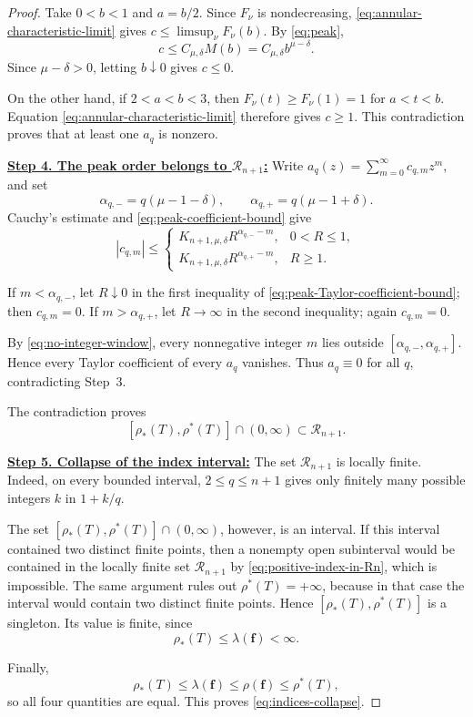 \documentclass[12pt,letterpaper,reqno]{amsart}
\theoremstyle{definition}
\numberwithin{equation}{section}
\newcommand{\Gn}{\mathcal R_{n+1}}
\newcommand{\fv}{\bm f}
\begin{document}
\begin{proof}
Take \(0<b<1\) and \(a=b/2\). Since \(F_\nu\) is nondecreasing,
\eqref{eq:annular-characteristic-limit} gives
\(c\leq\limsup_\nu F_\nu(b)\). By \eqref{eq:peak},
\[
c
\leq
C_{\mu,\delta}M(b)
=
C_{\mu,\delta}b^{\mu-\delta}.
\]
Since \(\mu-\delta>0\), letting \(b\downarrow0\) gives \(c\leq0\).

On the other hand, if \(2<a<b<3\), then
\(F_\nu(t)\geq F_\nu(1)=1\) for \(a<t<b\). Equation
\eqref{eq:annular-characteristic-limit} therefore gives \(c\geq1\).
This contradiction proves that at least one \(a_q\) is nonzero.


\medskip\noindent
\textbf{\underline{Step 4. The peak order belongs to \(\Gn\):}}
Write
\(a_q(z)=\sum_{m=0}^{\infty}c_{q,m}z^m\), and set
\[
\alpha_{q,-}=q(\mu-1-\delta),
\qquad
\alpha_{q,+}=q(\mu-1+\delta).
\]
Cauchy's estimate and \eqref{eq:peak-coefficient-bound} give
\begin{equation}\label{eq:peak-Taylor-coefficient-bound}
 |c_{q,m}|
 \leq
 \begin{cases}
 K_{n+1,\mu,\delta}R^{\alpha_{q,-}-m},
     &0<R\leq1,\\[2mm]
 K_{n+1,\mu,\delta}R^{\alpha_{q,+}-m},
     &R\geq1.
 \end{cases}
\end{equation}

If \(m<\alpha_{q,-}\), let \(R\downarrow0\) in the first inequality
of \eqref{eq:peak-Taylor-coefficient-bound}; then \(c_{q,m}=0\).
If \(m>\alpha_{q,+}\), let \(R\to\infty\) in the second inequality;
again \(c_{q,m}=0\).

By \eqref{eq:no-integer-window}, every nonnegative integer \(m\) lies
outside
\([\alpha_{q,-},\alpha_{q,+}]\). Hence every Taylor coefficient of
every \(a_q\) vanishes. Thus \(a_q\equiv0\) for all \(q\), contradicting
Step~3.

The contradiction proves
\begin{equation}\label{eq:positive-index-in-Rn}
 [\rho_*(T),\rho^*(T)]
 \cap(0,\infty)
 \subset\Gn.
\end{equation}


\medskip\noindent
\textbf{\underline{Step 5. Collapse of the index interval:}}
The set \(\Gn\) is locally finite. Indeed, on every bounded interval,
\(2\leq q\leq n+1\) gives only finitely many possible integers \(k\) in
\(1+k/q\).

The set
\([\rho_*(T),\rho^*(T)]\cap(0,\infty)\), however, is an interval.
If this interval contained two distinct finite points, then a nonempty
open subinterval would be contained in the locally finite set \(\Gn\) by
\eqref{eq:positive-index-in-Rn}, which is impossible. The same argument
rules out \(\rho^*(T)=+\infty\), because in that case the interval would
contain two distinct finite points. Hence
\([\rho_*(T),\rho^*(T)]\) is a singleton. Its value is finite, since
\[
\rho_*(T)\leq\lambda(\fv)<\infty.
\]

Finally,
\[
\rho_*(T)
\leq
\lambda(\fv)
\leq
\rho(\fv)
\leq
\rho^*(T),
\]
so all four quantities are equal. This proves
\eqref{eq:indices-collapse}.
\end{proof}
\end{document}
